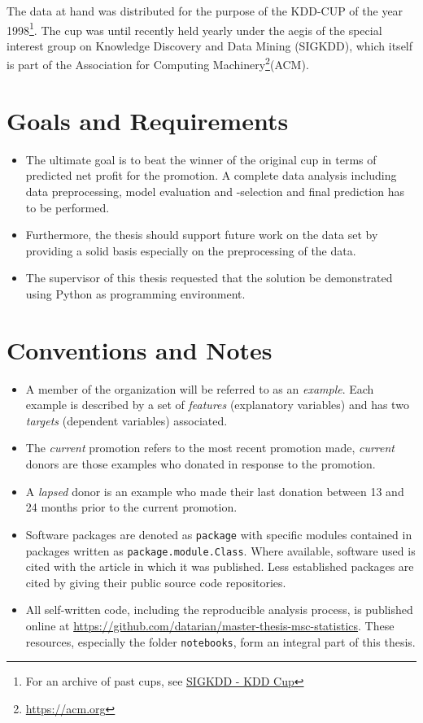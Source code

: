 \documentclass[
  11pt,
  a4paper,
  DIV=12,captions=tableheading,oneside,titlepage]{scrbook}
\providecommand{\tightlist}{%
  \setlength{\itemsep}{0pt}\setlength{\parskip}{0pt}}
\begin{document}
The data at hand was distributed for the purpose of the KDD-CUP of the year 1998\footnote{For an archive of past cups, see \href{http://www.kdd.org/kdd-cup}{SIGKDD - KDD Cup}}. The cup was until recently held yearly under the aegis of the special interest group on Knowledge Discovery and Data Mining (SIGKDD), which itself is part of the Association for Computing Machinery\footnote{\url{https://acm.org}}(ACM).

\hypertarget{goals-and-requirements}{%
\section{Goals and Requirements}\label{goals-and-requirements}}

\begin{itemize}
\tightlist
\item
  The ultimate goal is to beat the winner of the original cup in terms of predicted net profit for the promotion. A complete data analysis including data preprocessing, model evaluation and -selection and final prediction has to be performed.
\item
  Furthermore, the thesis should support future work on the data set by providing a solid basis especially on the preprocessing of the data.
\item
  The supervisor of this thesis requested that the solution be demonstrated using Python as programming environment.
\end{itemize}

\hypertarget{conventions-and-notes}{%
\section{Conventions and Notes}\label{conventions-and-notes}}

\begin{itemize}
\item
  A member of the organization will be referred to as an \emph{example}. Each example is described by a set of \emph{features} (explanatory variables) and has two \emph{targets} (dependent variables) associated.
\item
  The \emph{current} promotion refers to the most recent promotion made, \emph{current} donors are those examples who donated in response to the promotion.
\item
  A \emph{lapsed} donor is an example who made their last donation between 13 and 24 months prior to the current promotion.
\item
  Software packages are denoted as \texttt{package} with specific modules contained in packages written as \texttt{package.module.Class}. Where available, software used is cited with the article in which it was published. Less established packages are cited by giving their public source code repositories.
\item
  All self-written code, including the reproducible analysis process, is published online at \url{https://github.com/datarian/master-thesis-msc-statistics}. These resources, especially the folder \texttt{notebooks}, form an integral part of this thesis.
\end{itemize}
\end{document}
